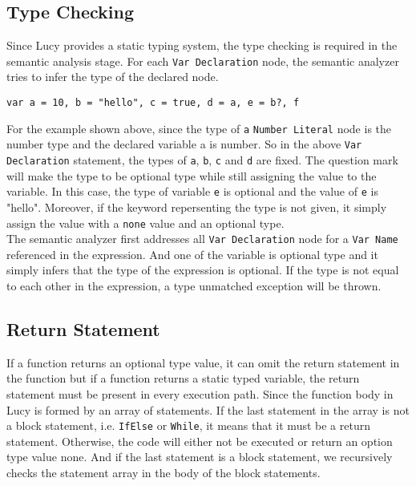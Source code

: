 \subsection{Type Checking}
Since Lucy provides a static typing system, the type checking is required in the semantic analysis stage. For each \texttt{Var Declaration} node, the semantic analyzer tries to infer the type of the declared node.
\begin{lstlisting}
var a = 10, b = "hello", c = true, d = a, e = b?, f
\end{lstlisting}
For the example shown above, since the type of \texttt{a} \texttt{Number Literal} node is the number type and the declared variable a is number. So in the above \texttt{Var Declaration} statement, the types of \texttt{a}, \texttt{b}, \texttt{c} and \texttt{d} are fixed. The question mark will make the type to be optional type while still assigning the value to the variable. In this case, the type of variable \texttt{e} is optional and the value of \texttt{e} is "hello". Moreover, if the keyword repersenting the type is not given, it simply assign the value with a \texttt{none} value and an optional type. \\
The semantic analyzer first addresses all \texttt{Var Declaration} node for a \texttt{Var Name} referenced in the expression. And one of the variable is optional type and it simply infers that the type of the expression is optional. If the type is not equal to each other in the expression, a type unmatched exception will be thrown.
\subsection{Return Statement}
If a function returns an optional type value, it can omit the return statement in the function but if a function returns a static typed variable, the return statement must be present in every execution path. Since the function body in Lucy is formed by an array of statements. If the last statement in the array is not a block statement, i.e. \texttt{IfElse} or \texttt{While}, it means that it must be a return statement. Otherwise, the code will either not be executed or return an option type value none. And if the last statement is a block statement, we recursively checks the statement array in the body of the block statements.


